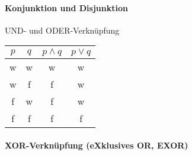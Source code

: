 \documentclass[10pt,a4paper]{article}
\begin{document}
\paragraph{Konjunktion und Disjunktion}UND- und ODER-Verknüpfung\\
\begin{tabular}{|c|c|c|c|}
    \hline
        $p$&$q$&$p\wedge q$&$p\vee q$\\
        \hline
        w&w&w&w\\
        w&f&f&w\\
        f&w&f&w\\
        f&f&f&f\\
    \hline
\end{tabular}
\paragraph{XOR-Verknüpfung (eXklusives OR, EXOR)}
\end{document}
